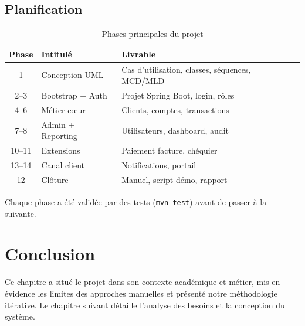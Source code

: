\subsection{Planification}

\begin{table}[H]
    \centering
    \caption{Phases principales du projet \nomapplication}
    \label{tab:phases}
    \small
    \begin{tabular}{@{}clp{7cm}@{}}
        \toprule
        \textbf{Phase} & \textbf{Intitulé} & \textbf{Livrable} \\
        \midrule
        1 & Conception UML & Cas d'utilisation, classes, séquences, MCD/MLD \\
        2--3 & Bootstrap + Auth & Projet Spring Boot, login, rôles \\
        4--6 & Métier cœur & Clients, comptes, transactions \\
        7--8 & Admin + Reporting & Utilisateurs, dashboard, audit \\
        10--11 & Extensions & Paiement facture, chéquier \\
        13--14 & Canal client & Notifications, portail \\
        12 & Clôture & Manuel, script démo, rapport \\
        \bottomrule
    \end{tabular}
\end{table}

Chaque phase a été validée par des tests (\texttt{mvn test}) avant de passer à la suivante.

\section{Conclusion}

Ce chapitre a situé le projet dans son contexte académique et métier, mis en évidence les limites des approches manuelles et présenté notre méthodologie itérative. Le chapitre suivant détaille l'analyse des besoins et la conception du système.
